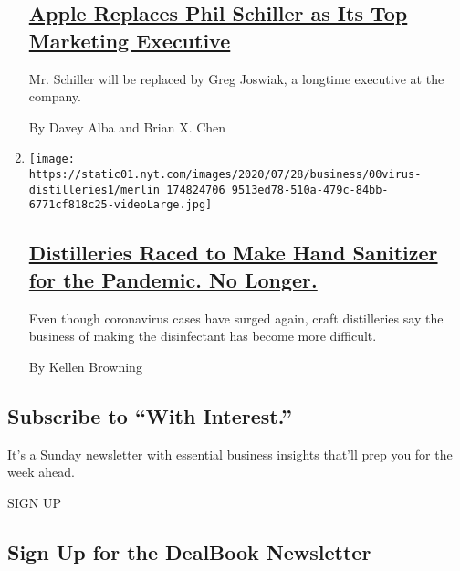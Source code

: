 \begin{enumerate}
  \hypertarget{apple-replaces-phil-schiller-as-its-top-marketing-executive}{%
  \subsection{\texorpdfstring{\href{/2020/08/04/technology/apple-schiller-marketing-executive-departure.html}{Apple
  Replaces Phil Schiller as Its Top Marketing
  Executive}}{Apple Replaces Phil Schiller as Its Top Marketing Executive}}\label{apple-replaces-phil-schiller-as-its-top-marketing-executive}}

  Mr. Schiller will be replaced by Greg Joswiak, a longtime executive at
  the company.

  By Davey Alba and Brian X. Chen
\item
  \texttt{[image: https://static01.nyt.com/images/2020/07/28/business/00virus-distilleries1/merlin\_174824706\_9513ed78-510a-479c-84bb-6771cf818c25-videoLarge.jpg]}

  \hypertarget{distilleries-raced-to-make-hand-sanitizer-for-the-pandemic-no-longer}{%
  \subsection{\texorpdfstring{\href{/2020/08/04/business/distilleries-hand-sanitizer-pandemic.html}{Distilleries
  Raced to Make Hand Sanitizer for the Pandemic. No
  Longer.}}{Distilleries Raced to Make Hand Sanitizer for the Pandemic. No Longer.}}\label{distilleries-raced-to-make-hand-sanitizer-for-the-pandemic-no-longer}}

  Even though coronavirus cases have surged again, craft distilleries
  say the business of making the disinfectant has become more difficult.

  By Kellen Browning
\end{enumerate}

\hypertarget{subscribe-to-with-interest}{%
\subsection{Subscribe to ``With
Interest.''}\label{subscribe-to-with-interest}}

It's a Sunday newsletter with essential business insights that'll prep
you for the week ahead.

SIGN UP

\hypertarget{sign-up-for-the-dealbook-newsletter}{%
\subsection{Sign Up for the DealBook
Newsletter}\label{sign-up-for-the-dealbook-newsletter}}

